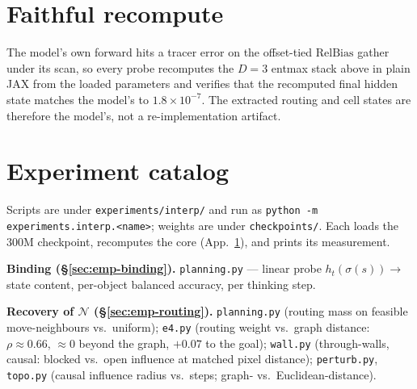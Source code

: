 \documentclass{article} %
\theoremstyle{plain}
\theoremstyle{definition}
\begin{document}
\section{Faithful recompute}
\label{app:recompute}

The model's own forward hits a tracer error on the offset-tied $\mathrm{RelBias}$
gather under its scan, so every probe recomputes the $D{=}3$ entmax stack above in
plain JAX from the loaded parameters and verifies that the recomputed final hidden
state matches the model's to $1.8\times10^{-7}$. The extracted routing and cell
states are therefore the model's, not a re-implementation artifact.

\section{Experiment catalog}
\label{app:experiments}

Scripts are under \texttt{experiments/interp/} and run as
\texttt{python -m experiments.interp.<name>}; weights are under
\texttt{checkpoints/}. Each loads the $300\mathrm{M}$ checkpoint, recomputes the
core (App.~\ref{app:recompute}), and prints its measurement.

\textbf{Binding (\S\ref{sec:emp-binding}).}
\texttt{planning.py} --- linear probe $h_t(\sigma(s))\!\to\!$ state content,
per-object balanced accuracy, per thinking step.

\textbf{Recovery of $\mathcal{N}$ (\S\ref{sec:emp-routing}).}
\texttt{planning.py} (routing mass on feasible move-neighbours vs.\ uniform);
\texttt{e4.py} (routing weight vs.\ graph distance: $\rho{\approx}0.66$, ${\approx}0$
beyond the graph, ${+}0.07$ to the goal); \texttt{wall.py} (through-walls,
causal: blocked vs.\ open influence at matched pixel distance);
\texttt{perturb.py}, \texttt{topo.py} (causal influence radius vs.\ steps; graph-
vs.\ Euclidean-distance).
\end{document}
